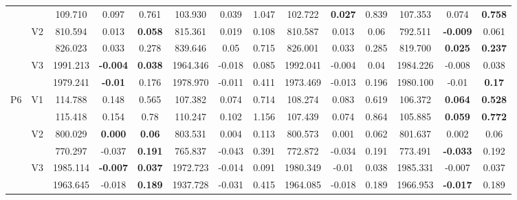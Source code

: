 \documentclass[12pt,a4paper]{article}
\begin{document}
\begin{sidewaystable}[ht]
{\begin{tabular}{cc|ccc|ccc|ccc|ccc|}
   &  & 109.710 & 0.097 & 0.761 & 103.930 & 0.039 & 1.047 & 102.722 & \textbf{0.027} & 0.839 & 107.353 & 0.074 & \textbf{0.758} \\ 
   & \multirow{2}{*}{V2} & 810.594 & 0.013 & \textbf{0.058} & 815.361 & 0.019 & 0.108 & 810.587 & 0.013 & 0.06 & 792.511 & \textbf{-0.009} & 0.061 \\ 
   &  & 826.023 & 0.033 & 0.278 & 839.646 & 0.05 & 0.715 & 826.001 & 0.033 & 0.285 & 819.700 & \textbf{0.025} & \textbf{0.237} \\ 
   & \multirow{2}{*}{V3} & 1991.213 & \textbf{-0.004} & \textbf{0.038} & 1964.346 & -0.018 & 0.085 & 1992.041 & -0.004 & 0.04 & 1984.226 & -0.008 & 0.038 \\ 
   &  & 1979.241 & \textbf{-0.01} & 0.176 & 1978.970 & -0.011 & 0.411 & 1973.469 & -0.013 & 0.196 & 1980.100 & -0.01 & \textbf{0.17} \\ 
   \hline \hline\multirow{6}{*}{P6} & \multirow{2}{*}{V1} & 114.788 & 0.148 & 0.565 & 107.382 & 0.074 & 0.714 & 108.274 & 0.083 & 0.619 & 106.372 & \textbf{0.064} & \textbf{0.528} \\ 
   &  & 115.418 & 0.154 & 0.78 & 110.247 & 0.102 & 1.156 & 107.439 & 0.074 & 0.864 & 105.885 & \textbf{0.059} & \textbf{0.772} \\ 
   & \multirow{2}{*}{V2} & 800.029 & \textbf{0.000} & \textbf{0.06} & 803.531 & 0.004 & 0.113 & 800.573 & 0.001 & 0.062 & 801.637 & 0.002 & 0.06 \\ 
   &  & 770.297 & -0.037 & \textbf{0.191} & 765.837 & -0.043 & 0.391 & 772.872 & -0.034 & 0.191 & 773.491 & \textbf{-0.033} & 0.192 \\ 
   & \multirow{2}{*}{V3} & 1985.114 & \textbf{-0.007} & \textbf{0.037} & 1972.723 & -0.014 & 0.091 & 1980.349 & -0.01 & 0.038 & 1985.331 & -0.007 & 0.037 \\ 
   &  & 1963.645 & -0.018 & \textbf{0.189} & 1937.728 & -0.031 & 0.415 & 1964.085 & -0.018 & 0.189 & 1966.953 & \textbf{-0.017} & 0.189 \\ 
   \hline
\end{tabular}
}
\end{sidewaystable}
\end{document}
